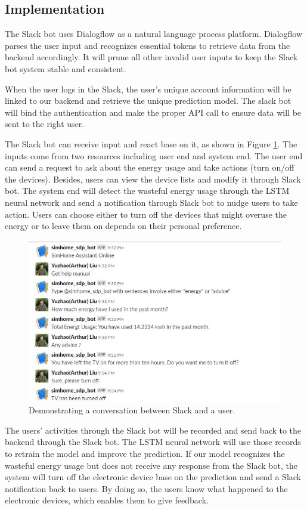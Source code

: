 \documentclass[conference]{IEEEtran}
\begin{document}
\subsection{Implementation}
The Slack bot uses Dialogflow as a natural language process platform. Dialogflow parses the user input and recognizes essential tokens to retrieve data from the backend accordingly. It will prune all other invalid user inputs to keep the Slack bot system stable and consistent.

When the user logs in the Slack, the user’s unique account information will be linked to our backend and retrieve the unique prediction model. The slack bot will bind the authentication and make the proper API call to ensure data will be sent to the right user.

The Slack bot can receive input and react base on it, as shown in Figure \ref{fig:slack}. The inputs come from two resources including user end and system end. The user end can send a request to ask about the energy usage and take actions (turn on/off the devices). Besides, users can view the device lists and modify it through Slack bot. The system end will detect the wasteful energy usage through the LSTM neural network and send a notification through Slack bot to nudge users to take action. Users can choose either to turn off the devices that might overuse the energy or to leave them on depends on their personal preference.

\begin{figure}[ht]
    \includegraphics[width=\linewidth]{img/slack.jpg}
    \caption{Demonstrating a conversation between Slack and a user.}
    \label{fig:slack}
\end{figure}

The users’ activities through the Slack bot will be recorded and send back to the backend through the Slack bot. The LSTM neural network will use those records to retrain the model and improve the prediction. If our model recognizes the wasteful energy usage but does not receive any response from the Slack bot, the system will turn off the electronic device base on the prediction and send a Slack notification back to users. By doing so, the users know what happened to the electronic devices, which enables them to give feedback.
\end{document}
